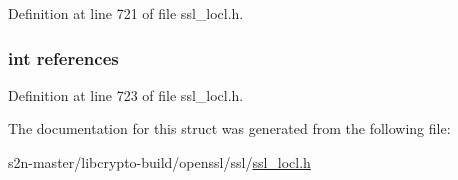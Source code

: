Definition at line 721 of file ssl\+\_\+locl.\+h.

\subsubsection[{\texorpdfstring{references}{references}}]{\setlength{\rightskip}{0pt plus 5cm}int references}\hypertarget{structsess__cert__st_a146fdb34d9a909e530adf8b189481195}{}\label{structsess__cert__st_a146fdb34d9a909e530adf8b189481195}


Definition at line 723 of file ssl\+\_\+locl.\+h.



The documentation for this struct was generated from the following file\+:\begin{DoxyCompactItemize}
\item 
s2n-\/master/libcrypto-\/build/openssl/ssl/\hyperlink{ssl__locl_8h}{ssl\+\_\+locl.\+h}\end{DoxyCompactItemize}
